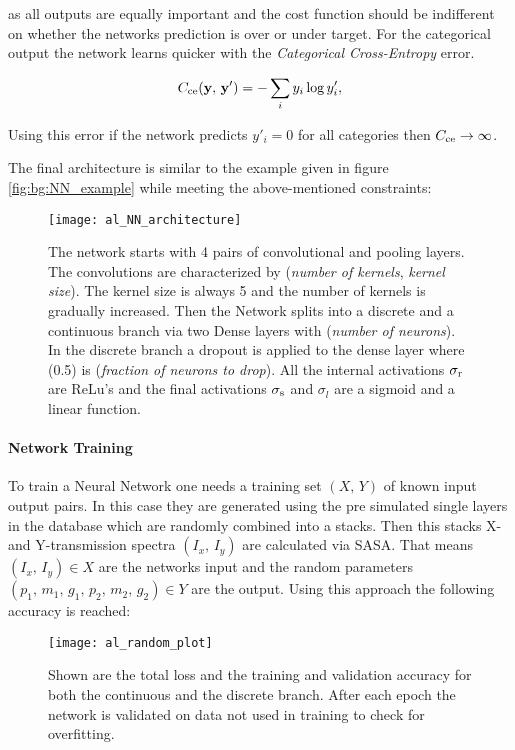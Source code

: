 \noindent
as all outputs are equally important and the cost function should be indifferent on whether the networks prediction is over or under target. For the categorical output the network learns quicker with the \textit{Categorical Cross-Entropy} error.

\begin{equation}
    C_{\mathrm{ce}}(\vb y, \, \vb y') = - \sum_i y_i \log y'_i,
\end{equation}

\noindent
Using this error if the network predicts $y'_i = 0$ for all categories then $C_{\mathrm{ce}} \rightarrow \infty$. 

The final architecture is similar to the example given in figure \ref{fig:bg:NN_example} while meeting the above-mentioned constraints:

\begin{figure}[H]
    \centering
    \texttt{[image: al\_NN\_architecture]}
    \caption{The network starts with 4 pairs of convolutional and pooling layers. The convolutions are characterized by (\textit{number of kernels}, \textit{kernel size}). The kernel size is always 5 and the number of kernels is gradually increased. Then the Network splits into a discrete and a continuous branch via two Dense layers with (\textit{number of neurons}). In the discrete branch a dropout is applied to the dense layer where (0.5) is (\textit{fraction of neurons to drop}).
    All the internal activations $\sigma_{\mathrm{r}}$ are ReLu's and the final activations $\sigma_{\mathrm{s}}$ and $\sigma_{l}$ are a sigmoid and a linear function.}
    \label{fig:al:NN_architecture}
\end{figure}

\newpage
\paragraph{Network Training}
To train a Neural Network one needs a training set $(X, \, Y)$ of known input output pairs. In this case they are generated using the pre simulated single layers in the database which are randomly combined into a stacks. Then this stacks X- and Y-transmission spectra $(I_x, \, I_y)$ are calculated via SASA.
That means $(I_x, \, I_y) \in X$ are the networks input and the random parameters $(p_1, \, m_1, \, g_1, \, p_2, \, m_2, \, g_2) \in Y$ are the output.
Using this approach the following accuracy is reached:

\begin{figure}[H]
    \centering
    \texttt{[image: al\_random\_plot]}
    \caption{ Shown are the total loss and the training and validation accuracy for both the continuous and the discrete branch. After each epoch the network is validated on data not used in training to check for overfitting.}
    \label{}
\end{figure}

